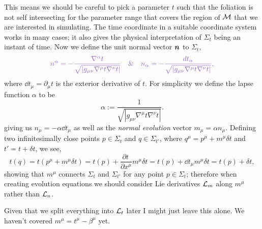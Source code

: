 This means we should be careful to pick a parameter $t$ such that the foliation is not self intersecting for the parameter range that covers the region of $\mathcal{M}$ that we are interested in simulating. The time coordinate in a suitable coordinate system works in many cases; it also gives the physical interpretation of $\Sigma_t$ being an instant of time. Now we define the unit normal vector $\boldsymbol{n}$ to $\Sigma_t$,
\begin{equation} \color{orchid}n^\alpha = -\frac{\nabla^\alpha t}{\sqrt{|g_{\mu\nu}\nabla^\mu t \nabla^\nu t|}} \quad \& \quad  n_\alpha = -\frac{dt_\alpha}{\sqrt{|g_{\mu\nu}\nabla^\mu t \nabla^\nu t|}},\color{black}\end{equation}
where $\dd t_\mu=\partial_\mu t$ is the exterior derivative of $t$.
For simplicity we define the lapse function $\alpha$ to be
\begin{equation}\alpha :=  \frac{1}{\sqrt{|g_{\mu\nu}\nabla^\mu t \nabla^\nu t|}}. \end{equation}
giving us $n_\mu = -\alpha \dd t_\mu$ as well as the {\it normal evolution} vector $m_\mu = \alpha n_\mu$. Defining two infinitesimally close points $p\in\Sigma_t$ and $q\in\Sigma_{t'}$, where $ q^\mu = p^\mu + m^\mu\delta t$ and $t' = t+ \delta t$, we see,
\begin{equation} t(q) = t(p^\mu +  m^\mu\delta t) = t(p) + \frac{\partial t^{\,}}{\partial x^\mu}m^\mu\delta t = t(p) + \dd t_\mu m^\mu \delta t =  t(p) + \delta t,\end{equation}
showing that $m^\mu$ connects $\Sigma_t$ and $\Sigma_{t'}$ for any point $p\in \Sigma_t$; therefore when creating evolution equations we should consider Lie derivatives $\mathcal{L}_m$ along $m^\mu$ rather than $\mathcal{L}_n$.

\color{choral} Given that we split everything into $\mathcal{L}_t$ later I might just leave this alone. We haven't covered $m^\mu = t^\mu - \beta^\mu$ yet. \color{black}



